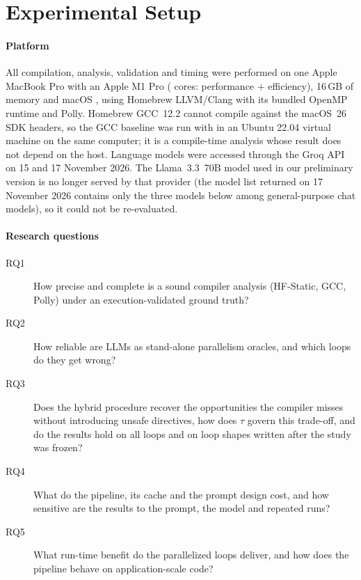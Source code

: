 \section{Experimental Setup}
\label{sec:setup}

\paragraph{Platform} All compilation, analysis, validation and timing were performed on one Apple MacBook Pro with an Apple M1 Pro (\nCpuCores{} cores: \nPerfCores{} performance + \nEffCores{} efficiency), 16\,GB of memory and macOS \macosVersion{}, using Homebrew LLVM/Clang \llvmVersion{} with its bundled OpenMP runtime and Polly. Homebrew GCC~12.2 cannot compile against the macOS~26 SDK headers, so the GCC baseline was run with \gccVersion{} in an Ubuntu 22.04 virtual machine on the same computer; it is a compile-time analysis whose result does not depend on the host. Language models were accessed through the Groq API on 15 and 17 November 2026. The Llama~3.3~70B model used in our preliminary version is no longer served by that provider (the model list returned on 17 November 2026 contains only the three models below among general-purpose chat models), so it could not be re-evaluated.

\paragraph{Research questions}
\begin{description}
  \item[RQ1] How precise and complete is a sound compiler analysis (HF-Static, GCC, Polly) under an execution-validated ground truth?
  \item[RQ2] How reliable are LLMs as stand-alone parallelism oracles, and which loops do they get wrong?
  \item[RQ3] Does the hybrid procedure recover the opportunities the compiler misses without introducing unsafe directives, how does $\tau$ govern this trade-off, and do the results hold on all loops and on loop shapes written after the study was frozen?
  \item[RQ4] What do the pipeline, its cache and the prompt design cost, and how sensitive are the results to the prompt, the model and repeated runs?
  \item[RQ5] What run-time benefit do the parallelized loops deliver, and how does the pipeline behave on application-scale code?
\end{description}

